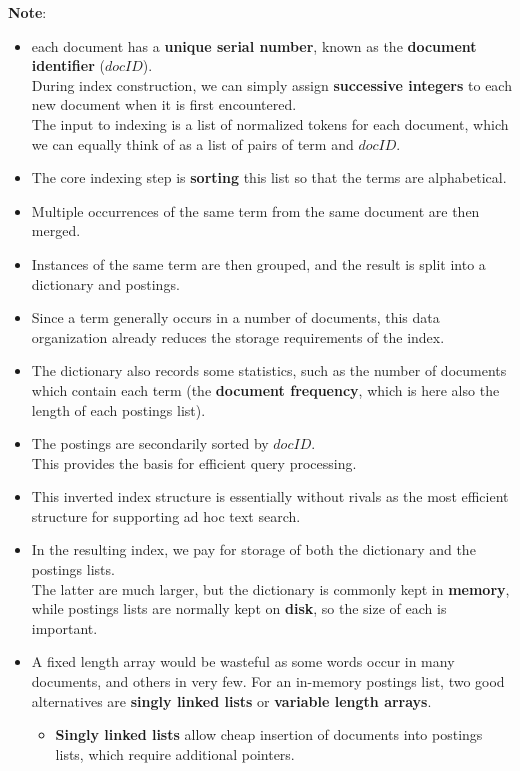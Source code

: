 \noindent\textbf{Note}:
\begin{itemize}
    \item each document has a \textbf{unique serial number}, known as the \textbf{document identifier} ($docID$).\\
    During index construction, we can simply assign \textbf{successive integers} to each new document when it is first encountered.\\
    The input to indexing is a list of normalized tokens for each document, which we can equally think of as a list of pairs of term and $docID$.

    \item The core indexing step is \textbf{sorting} this list so that the terms are alphabetical.

    \item Multiple occurrences of the same term from the same document are then merged.

    \item Instances of the same term are then grouped, and the result is split into a dictionary and postings.

    \item Since a term generally occurs in a number of documents, this data organization already reduces the storage requirements of the index. 
    
    \item The dictionary also records some statistics, such as the number of documents which contain each term (the \textbf{document frequency}, which is here also the length of each postings list).

    \item The postings are secondarily sorted by $docID$.\\
    This provides the basis for efficient query processing.

    \item This inverted index structure is essentially without rivals as the most efficient structure for supporting ad hoc text search.

    \item In the resulting index, we pay for storage of both the dictionary and the postings lists.\\
    The latter are much larger, but the dictionary is commonly kept in \textbf{memory}, while postings lists are normally kept on \textbf{disk}, so the size of each is important.

    \item A fixed length array would be wasteful as some words occur in many documents, and others in very few. For an in-memory postings list, two good alternatives are \textbf{singly linked lists} or \textbf{variable length arrays}.
    \begin{itemize}
        \item \textbf{Singly linked lists} allow cheap insertion of documents into postings lists, which require additional pointers.


\end{itemize}
\end{itemize}
